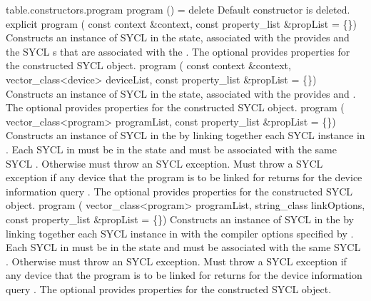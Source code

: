 {table.constructors.program}
  \addRow
    {program () = delete}
    {
      Default constructor is deleted.
    }
  \addRowThreeL
    {explicit program (}
    {const context \&context,}
    {const property_list \&propList = \{\})}
    {
      Constructs an instance of SYCL  in the
       state, associated with the
       provides and the SYCL s that are
      associated with the .
      The optional  provides properties for the
      constructed SYCL  object.
    }
  \addRowFourL
    {program (}
    {const context \&context,}
    {vector_class<device> deviceList,}
    {const property_list \&propList = \{\})}
    {
      Constructs an instance of SYCL  in the
       state, associated with the
       provides and .
      The optional  provides properties for the
      constructed SYCL  object.
    }
  \addRowThreeL
    {program (}
    {vector_class<program> programList,}
    {const property_list \&propList = \{\})}
    {
      Constructs an instance of SYCL  in the
       by linking together each SYCL
       instance in . Each SYCL
       in  must be in the
       state and must be associated with the
      same SYCL . Otherwise must throw an
       SYCL exception.  Must throw a
       SYCL exception if any device that the
      program is to be linked for returns  for the device
      information query .
      The optional  provides properties for the
      constructed SYCL  object.
    }
  \addRowFourL
    {program (}
    {vector_class<program> programList,}
    {string_class linkOptions,}
    {const property_list \&propList = \{\})}
    {
      Constructs an instance of SYCL  in the
       by linking together each SYCL
       instance in  with the
      compiler options specified by . Each SYCL
       in  must be in the
       state and must be associated with the
      same SYCL . Otherwise must throw an
       SYCL exception.
      Must throw a  SYCL exception if any
      device that the program is to be linked for returns  for
      the device information query
      .
      The optional  provides properties for the
      constructed SYCL  object.
    }
